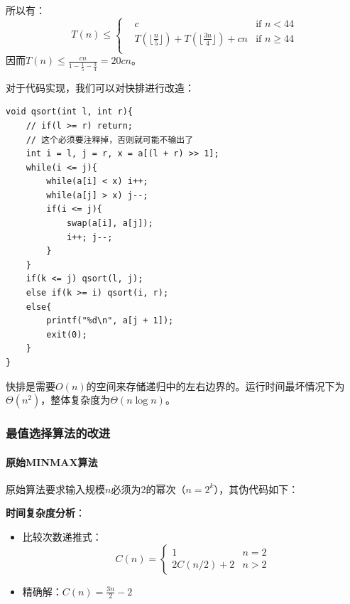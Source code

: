 \documentclass[./../main.tex]{subfiles}
\begin{document}
所以有：
\[
    T(n)\le\left\{
        \begin{aligned}
            &c&\text{if  }n<44\\
            &T(\lfloor\frac{n}{5}\rfloor)+T(\lfloor\frac{3n}{4}\rfloor)+cn&\text{if }n\ge44\\
        \end{aligned}
    \right.
\]
因而$T(n)\le\frac{cn}{1-\frac{1}{5}-\frac{3}{4}}=20cn$。

对于代码实现，我们可以对快排进行改造：
\begin{lstlisting}
void qsort(int l, int r){
    // if(l >= r) return;
    // 这个必须要注释掉，否则就可能不输出了
    int i = l, j = r, x = a[(l + r) >> 1];
    while(i <= j){
        while(a[i] < x) i++;
        while(a[j] > x) j--;
        if(i <= j){
            swap(a[i], a[j]);
            i++; j--;
        }
    }
    if(k <= j) qsort(l, j);
    else if(k >= i) qsort(i, r);
    else{
        printf("%d\n", a[j + 1]);
        exit(0);
    }
}
\end{lstlisting}

快排是需要$O(n)$的空间来存储递归中的左右边界的。运行时间最坏情况下为$\Theta(n^2)$，整体复杂度为$\Theta(n\log n)$。

\subsubsection{最值选择算法的改进}

\paragraph{原始MINMAX算法}
原始算法要求输入规模$n$必须为2的幂次（$n=2^k$），其伪代码如下：

\begin{algorithm}[H]
\caption{Original MinMax Algorithm (Requires $n=2^k$)}
\end{algorithm}

\textbf{时间复杂度分析}：
\begin{itemize}
    \item 比较次数递推式：
    $$ 
    C(n) = \begin{cases} 
        1 & n=2 \\
        2C(n/2)+2 & n>2 
    \end{cases}
    $$
    \item 精确解：$C(n) = \frac{3n}{2} - 2$
\end{itemize}
\end{document}
